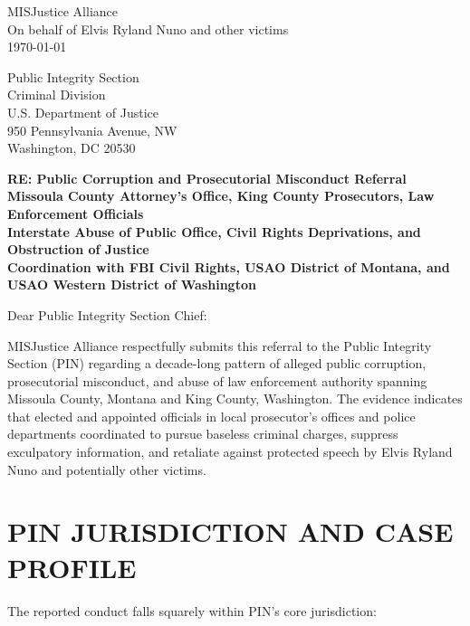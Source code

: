 \documentclass[12pt,oneside]{article}
\begin{document}
\begin{flushleft}

MISJustice Alliance \\
On behalf of Elvis Ryland Nuno and other victims \\
\today

\vspace{0.3in}

Public Integrity Section \\
Criminal Division \\
U.S. Department of Justice \\
950 Pennsylvania Avenue, NW \\
Washington, DC 20530

\vspace{0.3in}

\textbf{RE: Public Corruption and Prosecutorial Misconduct Referral} \\
\textbf{Missoula County Attorney's Office, King County Prosecutors, Law Enforcement Officials} \\
\textbf{Interstate Abuse of Public Office, Civil Rights Deprivations, and Obstruction of Justice} \\
\textbf{Coordination with FBI Civil Rights, USAO District of Montana, and USAO Western District of Washington}

\vspace{0.3in}

Dear Public Integrity Section Chief:

\vspace{0.2in}

MISJustice Alliance respectfully submits this referral to the Public Integrity Section (PIN) regarding a decade-long pattern of alleged public corruption, prosecutorial misconduct, and abuse of law enforcement authority spanning Missoula County, Montana and King County, Washington. The evidence indicates that elected and appointed officials in local prosecutor's offices and police departments coordinated to pursue baseless criminal charges, suppress exculpatory information, and retaliate against protected speech by Elvis Ryland Nuno and potentially other victims.

\section*{PIN JURISDICTION AND CASE PROFILE}

The reported conduct falls squarely within PIN's core jurisdiction:


\end{flushleft}
\end{document}
